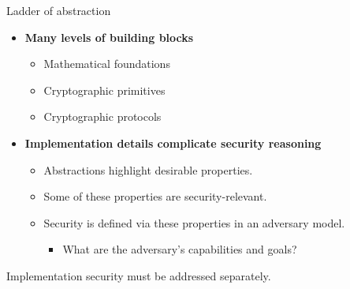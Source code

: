 \begin{frame}{Ladder of abstraction}

  \pause
  \begin{itemize}
    \item \textbf{Many levels of building blocks}
    \pause
    \begin{itemize}
      \item Mathematical foundations
      \item Cryptographic primitives
      \item Cryptographic protocols
    \end{itemize}

    \vspace*{1em}

    \pause
    \item \textbf{Implementation details complicate security reasoning}
    \pause
    \begin{itemize}
      \item Abstractions highlight desirable properties.
      \item Some of these properties are security-relevant.
      \item Security is defined via these properties in an adversary model.
      \par
      \begin{itemize}
        \item What are the adversary's capabilities and goals?
      \end{itemize}
    \end{itemize}
  \end{itemize}

  \vspace*{1em}

  \pause
  Implementation security must be addressed separately.
\end{frame}

